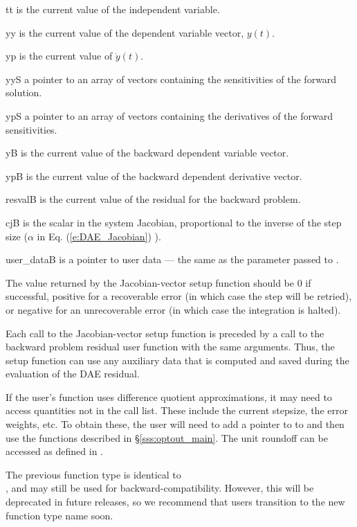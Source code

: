 {
  \begin{args}
  \item[tt]
    is the current value of the independent variable.
  \item[yy]
    is the current value of the dependent variable vector, $y(t)$.
  \item[yp]
    is the current value of $\dot{y}(t)$.
  \item[yyS]
    a pointer to an array of  vectors containing the sensitivities of
    the forward solution.
  \item[ypS]
    a pointer to an array of  vectors containing the derivatives of
    the forward sensitivities.
  \item[yB]
    is the current value of the backward dependent variable vector.
  \item[ypB]
    is the current value of the backward dependent derivative vector.
  \item[resvalB]
    is the current value of the residual for the backward problem.
  \item[cjB]
    is the scalar in the system Jacobian, proportional to the inverse of the
    step size ($\alpha$ in Eq. (\ref{e:DAE_Jacobian}) ).
  \item[user\_dataB]
    is a pointer to user data --- the same as the 
    parameter passed to .
  \end{args}
}
{
  The value returned by the Jacobian-vector setup function
  should be $0$ if successful, positive for a recoverable error (in
  which case the step will be retried), or negative for an
  unrecoverable error (in which case the integration is halted).
}
{
  Each call to the Jacobian-vector setup function is preceded by a call to
  the backward problem residual user function with the same
   arguments.
  Thus, the setup function can use any auxiliary data that is computed
  and saved during the evaluation of the DAE residual.

  If the user's  function uses difference quotient
  approximations, it may need to access quantities not in the call
  list. These include the current stepsize, the error weights, etc.
  To obtain these, the user will need to add a pointer to 
  to  and then use the  functions described in
  \S\ref{sss:optout_main}. The unit roundoff can be accessed as
   defined in .

  The previous function type  is identical
  to \\ \noindent {}, and may still be used for
  backward-compatibility.  However, this will be deprecated in future
  releases, so we recommend that users transition to the new function
  type name soon.
}
